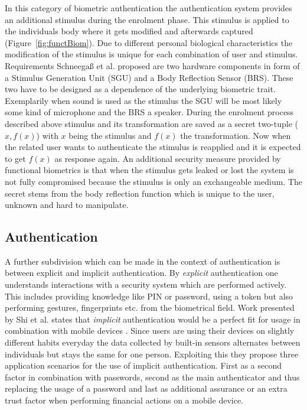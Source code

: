 \newline
In this category of biometric authentication the authentication system provides an additional stimulus during the enrolment phase.
This stimulus is applied to the individuals body where it gets modified and afterwards captured (Figure~\ref{fig:functBiom}).
Due to different personal biological characteristics the modification of the stimulus is unique for each combination of user and stimulus.
Requirements Schneegaß et al. proposed are two hardware components in form of a Stimulus Generation Unit (SGU) and a Body Reflection Sensor (BRS).
These two have to be designed as a dependence of the underlying biometric trait. Exemplarily when sound is used as the stimulus the SGU will be most likely some kind of microphone and the BRS a speaker.
During the enrolment process described above stimulus and its transformation are saved as a secret two-tuple ($x, f(x)$) with $ x $ being the stimulus and $ f(x) $ the transformation.
Now when the related user wants to authenticate the stimulus is reapplied and it is expected to get $f(x)$ as response again.
An additional security measure provided by functional biometrics is that when the stimulus gets leaked or lost the system is not fully compromised because the stimulus is only an exchangeable medium.
The secret stems from the body reflection function which is unique to the user, unknown and hard to manipulate.
\subsection{Authentication} 
A further subdivision which can be made in the context of authentication is between explicit and implicit authentication. By \textit{explicit} authentication one understands interactions with a security system which are performed actively.
This includes providing knowledge like PIN or password, using a token but also performing gestures, fingerprints etc. from the biometrical field. 
Work presented by Shi et al. states that \textit{implicit} authentication would be a perfect fit for usage in combination with mobile devices \cite{shi2010implicit}.
Since users are using their devices on slightly different habits everyday the data collected by built-in sensors alternates between individuals but stays the same for one person.
Exploiting this they propose three application scenarios for the use of implicit authentication.
First as a second factor in combination with passwords, second as the main authenticator and thus replacing the usage of a password and last as additional assurance or an extra trust factor when performing financial actions on a mobile device.

